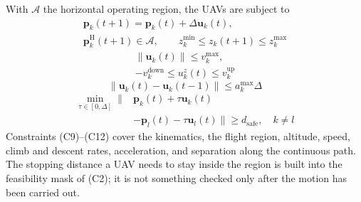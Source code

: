 With $\mathcal A$ the horizontal operating region, the UAVs are subject to
\begin{equation}
\begin{gathered}
\boldsymbol p_k(t+1)=\boldsymbol p_k(t)+\Delta\boldsymbol u_k(t),\\
\boldsymbol p_k^{\mathrm H}(t+1)\in\mathcal A,\qquad
z_k^{\min}\le z_k(t+1)\le z_k^{\max}
\end{gathered}
\tag{C9}\label{con:position}
\end{equation}
\begin{equation}
\begin{gathered}
\|\boldsymbol u_k(t)\|\le v_k^{\max},\\
-v_k^{\mathrm{down}}\le u_k^z(t)\le v_k^{\mathrm{up}}
\end{gathered}
\tag{C10}\label{con:speed}
\end{equation}
\begin{equation}
\|\boldsymbol u_k(t)-\boldsymbol u_k(t-1)\|
\le a_k^{\max}\Delta
\tag{C11}\label{con:acceleration}
\end{equation}
\begin{equation}
\begin{aligned}
\min_{\tau\in[0,\Delta]}\|&\boldsymbol p_k(t)+\tau\boldsymbol u_k(t)\\
&-\boldsymbol p_l(t)-\tau\boldsymbol u_l(t)\|
\ge d_{\mathrm{safe}},\quad k\ne l
\end{aligned}
\tag{C12}\label{con:separation}
\end{equation}
Constraints (C9)--(C12) cover the kinematics, the flight region, altitude,
speed, climb and descent rates, acceleration, and separation along the
continuous path. The stopping distance a UAV needs to stay inside the region
is built into the feasibility mask of (C2); it is not something checked only
after the motion has been carried out.

